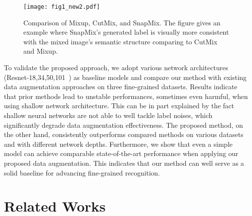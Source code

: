 \documentclass[letterpaper]{article} \usepackage{aaai21}  \usepackage{times}  \usepackage{helvet} \usepackage{courier}  \usepackage[hyphens]{url}  \usepackage{graphicx} \urlstyle{rm} \def\UrlFont{\rm}  \usepackage{natbib}  \usepackage{caption} \frenchspacing  \setlength{\pdfpagewidth}{8.5in}  \setlength{\pdfpageheight}{11in}
\begin{document}
\begin{figure*}[t]
  \begin{center}
    \texttt{[image: fig1\_new2.pdf]}
  \end{center}
  \caption{Comparison of Mixup, CutMix, and SnapMix. The figure gives an example where SnapMix's generated label is visually more consistent with the mixed image's semantic structure comparing to CutMix and Mixup.}
\label{fig:title}
\end{figure*}


To validate the proposed approach, we adopt various network architectures (Resnet-18,34,50,101~\cite{he2016deep}) as baseline models and 
compare our method with existing data augmentation approaches 
on three fine-grained datasets. 
Results indicate that prior methods
lead to unstable performances, sometimes even harmful,
when using shallow network architecture.
This can be in part explained by the fact 
shallow neural networks are not able
to well tackle  label noises,
which significantly degrade data augmentation effectiveness.
The proposed method, on the other hand,
consistently outperforms compared methods
on various datasets and with different network depths. 
Furthermore, we show that even a simple model can achieve comparable state-of-the-art performance when applying our proposed data augmentation. 
This indicates that our method can well serve as a  solid
baseline for advancing fine-grained recognition.
 




\section{Related Works}
\end{document}
